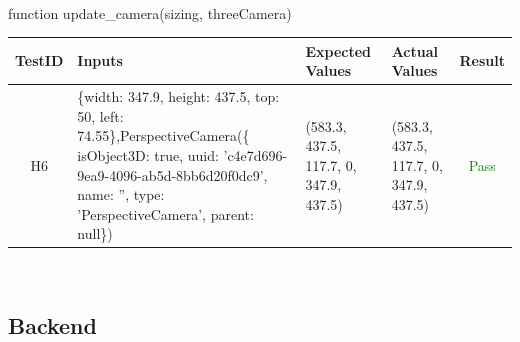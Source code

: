 \documentclass[12pt, oneside, openany, titlepage]{article}
\begin{document}
\\
function update\_camera(sizing, threeCamera)\\
\begin{tabular}{ |c|p{5cm}|p{3.5cm}|p{3.5cm}|c| } 
 \hline
 TestID & Inputs & Expected Values & Actual Values & Result \\ 
 \hline
 H6 & \{width: 347.9, height: 437.5, top: 50, left: 74.55\},PerspectiveCamera(\{ isObject3D: true, uuid: 'c4e7d696-9ea9-4096-ab5d-8bb6d20f0dc9', name: '', type: 'PerspectiveCamera', parent: null\}) & (583.3, 437.5, 117.7, 0, 347.9, 437.5) & (583.3, 437.5, 117.7, 0, 347.9, 437.5) & \textcolor{green}{Pass} \\ 
 \hline

\end{tabular}
\\



\subsection{Backend}
\end{document}
